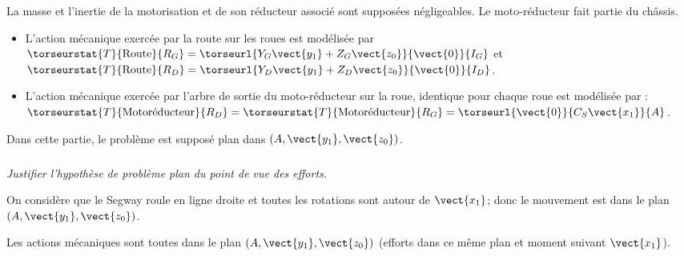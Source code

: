 \documentclass[10pt,fleqn]{article} %
\begin{document}
La masse et l’inertie de la motorisation et de son réducteur associé sont supposées négligeables. Le moto-réducteur fait partie du châssis.
\begin{itemize}
\item L’action mécanique exercée par la route sur les roues est modélisée par  
$\torseurstat{T}{\text{Route}}{R_G} = \torseurl{Y_G\vect{y_1}+Z_G\vect{z_0}}{\vect{0}}{I_G}$
 et  
$\torseurstat{T}{\text{Route}}{R_D} = \torseurl{Y_D\vect{y_1}+Z_D\vect{z_0}}{\vect{0}}{I_D}$.
\item L’action mécanique exercée par l'arbre de sortie du moto-réducteur sur la roue, identique pour chaque roue est modélisée par :  
$\torseurstat{T}{\text{Motoréducteur}}{R_D}
= \torseurstat{T}{\text{Motoréducteur}}{R_G}
 = \torseurl{\vect{0}}{C_S\vect{x_1}}{A}$.
 \end{itemize}
Dans cette partie, le problème est supposé plan dans $\left(A,\vect{y_1},\vect{z_0}\right)$.

\fi
\subparagraph{\label{q_17}}\textit{Justifier l'hypothèse de problème plan du point de vue des efforts.}
\ifprof
\begin{corrige}
On considère que le Segway roule en ligne droite et toutes les rotations sont autour de $\vect{x_1}$; donc le mouvement est dans le plan $\left(A,\vect{y_1},\vect{z_0}\right)$.

Les actions mécaniques sont toutes dans le plan $\left(A,\vect{y_1},\vect{z_0}\right)$ (efforts dans ce même plan et moment suivant $\vect{x_1}$).


\end{corrige}
\else
\fi
\end{document}
